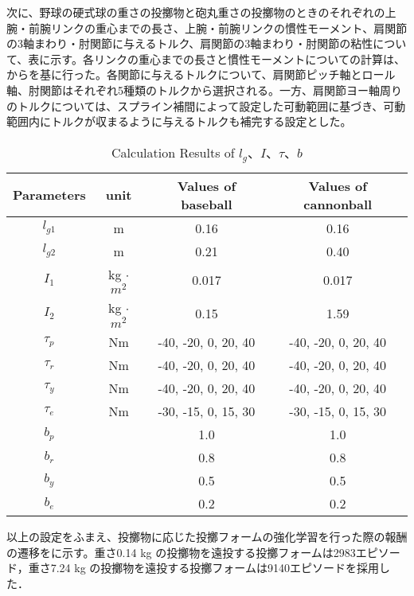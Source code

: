 次に、野球の硬式球の重さの投擲物と砲丸重さの投擲物のときのそれぞれの上腕・前腕リンクの重心までの長さ、上腕・前腕リンクの慣性モーメント、肩関節の3軸まわり・肘関節に与えるトルク、肩関節の3軸まわり・肘関節の粘性について、表に示す。各リンクの重心までの長さと慣性モーメントについての計算は、からを基に行った。各関節に与えるトルクについて、肩関節ピッチ軸とロール軸、肘関節はそれぞれ5種類のトルクから選択される。一方、肩関節ヨー軸周りのトルクについては、スプライン補間によって設定した可動範囲に基づき、可動範囲内にトルクが収まるように与えるトルクも補完する設定とした。

\begin{table}[tb]
  \begin{center}
    \caption{Calculation Results of $l_{g}$、$I$、$\tau$、$b$}

    \begin{tabular}{c c c c}
      \hline
      Parameters & unit & Values of baseball & Values of cannonball \\
      \hline
      $l_{g1}$ & m & 0.16 & 0.16 \\
      $l_{g2}$ & m & 0.21 & 0.40 \\
      $I_{1}$ & kg $\cdot$ ${m}^2$ & 0.017 & 0.017 \\
      $I_{2}$ & kg $\cdot$ ${m}^2$ & 0.15 & 1.59 \\
      $\tau_{p}$ & Nm & -40, -20, 0, 20, 40 & -40, -20, 0, 20, 40 \\
      $\tau_{r}$ & Nm & -40, -20, 0, 20, 40 & -40, -20, 0, 20, 40 \\
      $\tau_{y}$ & Nm & -40, -20, 0, 20, 40 & -40, -20, 0, 20, 40 \\
      $\tau_{e}$ & Nm & -30, -15, 0, 15, 30 & -30, -15, 0, 15, 30 \\
      $b_{p}$ &  & 1.0 & 1.0\\
      $b_{r}$ &  & 0.8 & 0.8\\
      $b_{y}$ &  & 0.5 & 0.5\\
      $b_{e}$ &  & 0.2 & 0.2\\
      \hline
    \end{tabular}
  \end{center}
\end{table}

以上の設定をふまえ、投擲物に応じた投擲フォームの強化学習を行った際の報酬の遷移をに示す。重さ0.14 kg の投擲物を遠投する投擲フォームは2983エピソード，重さ7.24 kg の投擲物を遠投する投擲フォームは9140エピソードを採用した．


